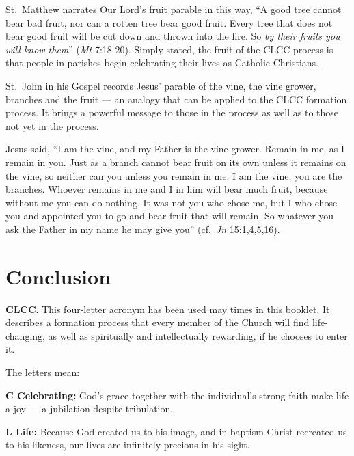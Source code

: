\documentclass{article}
\begin{document}
St.\ Matthew narrates Our Lord's fruit parable in this way, ``A good tree cannot
bear bad fruit, nor can a rotten tree bear good fruit. Every tree that does not
bear good fruit will be cut down and thrown into the fire. So \emph{by their
fruits you will know them}'' (\emph{Mt} 7:18-20). Simply stated, the fruit of
the CLCC process is that people in parishes begin celebrating their lives as
Catholic Christians.

St.\ John in his Gospel records Jesus' parable of the vine, the vine grower,
branches and the fruit --- an analogy that can be applied to the CLCC formation
process. It brings a powerful message to those in the process as well as to
those not yet in the process.

Jesus said, ``I am the vine, and my Father is the vine grower. Remain in me, as
I remain in you. Just as a branch cannot bear fruit on its own unless it remains
on the vine, so neither can you unless you remain in me. I am the vine, you are
the branches. Whoever remains in me and I in him will bear much fruit, because
without me you can do nothing. It was not you who chose me, but I who chose you
and appointed you to go and bear fruit that will remain. So whatever you ask the
Father in my name he may give you'' (cf.\ \emph{Jn} 15:1,4,5,16).


\section{Conclusion}

\textbf{CLCC}. This four-letter acronym has been used may times in this
booklet. It describes a formation process that every member of the Church will
find life-changing, as well as spiritually and intellectually rewarding, if he
chooses to enter it. \newline

The letters mean: \newline

\textbf{C Celebrating:} God's grace together with the individual's strong faith
make life a joy --- a jubilation despite tribulation. \newline

\textbf{L Life:} Because God created us to his image, and in baptism Christ
recreated us to his likeness, our lives are infinitely precious in his
sight. \newline
\end{document}
